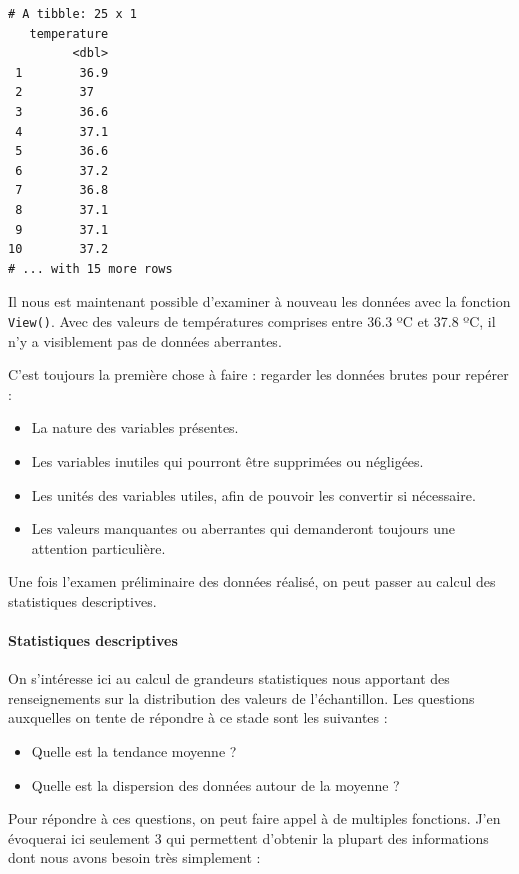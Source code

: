 \documentclass[
  a4paper,
]{article}
\providecommand{\tightlist}{%
  \setlength{\itemsep}{0pt}\setlength{\parskip}{0pt}}
\begin{document}
\begin{verbatim}
# A tibble: 25 x 1
   temperature
         <dbl>
 1        36.9
 2        37  
 3        36.6
 4        37.1
 5        36.6
 6        37.2
 7        36.8
 8        37.1
 9        37.1
10        37.2
# ... with 15 more rows
\end{verbatim}

Il nous est maintenant possible d'examiner à nouveau les données avec la fonction \texttt{View()}. Avec des valeurs de températures comprises entre 36.3 ºC et 37.8 ºC, il n'y a visiblement pas de données aberrantes.

C'est toujours la première chose à faire : regarder les données brutes pour repérer :

\begin{itemize}
\tightlist
\item
  La nature des variables présentes.
\item
  Les variables inutiles qui pourront être supprimées ou négligées.
\item
  Les unités des variables utiles, afin de pouvoir les convertir si nécessaire.
\item
  Les valeurs manquantes ou aberrantes qui demanderont toujours une attention particulière.
\end{itemize}

Une fois l'examen préliminaire des données réalisé, on peut passer au calcul des statistiques descriptives.

\hypertarget{statistiques-descriptives}{%
\paragraph{Statistiques descriptives}\label{statistiques-descriptives}}

On s'intéresse ici au calcul de grandeurs statistiques nous apportant des renseignements sur la distribution des valeurs de l'échantillon. Les questions auxquelles on tente de répondre à ce stade sont les suivantes :

\begin{itemize}
\tightlist
\item
  Quelle est la tendance moyenne ?
\item
  Quelle est la dispersion des données autour de la moyenne ?
\end{itemize}

Pour répondre à ces questions, on peut faire appel à de multiples fonctions. J'en évoquerai ici seulement 3 qui permettent d'obtenir la plupart des informations dont nous avons besoin très simplement :
\end{document}
